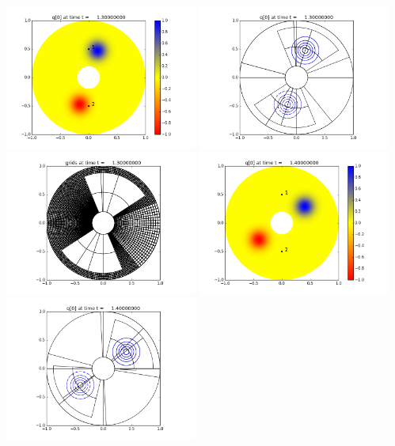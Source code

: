 \documentclass[11pt]{article}
\begin{document}
\vskip 10pt 
\includegraphics[width=0.475\textwidth]{frame0013fig0.png}
\includegraphics[width=0.475\textwidth]{frame0013fig1.png}
\vskip 10pt 
\includegraphics[width=0.475\textwidth]{frame0013fig2.png}
\vskip 10pt 
\includegraphics[width=0.475\textwidth]{frame0014fig0.png}
\includegraphics[width=0.475\textwidth]{frame0014fig1.png}
\end{document}
